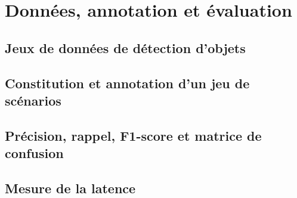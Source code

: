 
\section{Données, annotation et évaluation}


\subsection{Jeux de données de détection d'objets}

\subsection{Constitution et annotation d'un jeu de scénarios}

\subsection{Précision, rappel, F1-score et matrice de confusion}

\subsection{Mesure de la latence}
